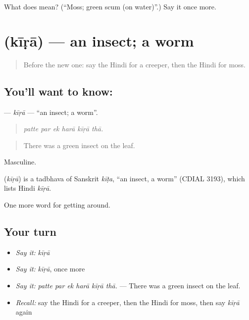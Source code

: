 \begin{tcolorbox}[breakable,colback=teal!4,colframe=teal!35!black,title={Before you move on}]
What does  mean? (\textquotedblleft{}Moss; green scum (on water)\textquotedblright{}.) Say it once more.
\end{tcolorbox}
\section[\texorpdfstring{\hi{कीड़ा} (kīṛā)}{कीड़ा (kīṛā)}]{ (kīṛā) — an insect; a worm}

\label{lesson:HI-C447-kira}



\begin{quote}
Before the new one: say the Hindi for a creeper, then the Hindi for moss.
\end{quote}

\subsection*{You'll want to know: }
\textbf{} — \emph{kīṛā} — \textquotedblleft{}an insect; a worm\textquotedblright{}.

\begin{quote}
     
\end{quote}

\begin{quote}
\emph{patte par ek harā kīṛā thā.}
\end{quote}

\begin{quote}
There was a green insect on the leaf.
\end{quote}

Masculine.

\begin{cousinweb}
\textbf{} (\emph{kīṛā}) is a tadbhava of Sanskrit \emph{kīṭa}, \textquotedblleft{}an insect, a worm\textquotedblright{} (CDIAL 3193), which lists Hindi \emph{kīṛā}.
\end{cousinweb}

\begin{grammarlens}[title={What you've built}]
One more word for getting around.
\end{grammarlens}

\subsection*{Your turn}
\begin{itemize}
\raggedright
  \item \emph{Say it:} \emph{kīṛā}
  \item \emph{Say it:} \emph{kīṛā}, once more
  \item \emph{Say it:} \emph{patte par ek harā kīṛā thā.} — There was a green insect on the leaf.
  \item \emph{Recall:} say the Hindi for a creeper, then the Hindi for moss, then say \emph{kīṛā} again
\end{itemize}

